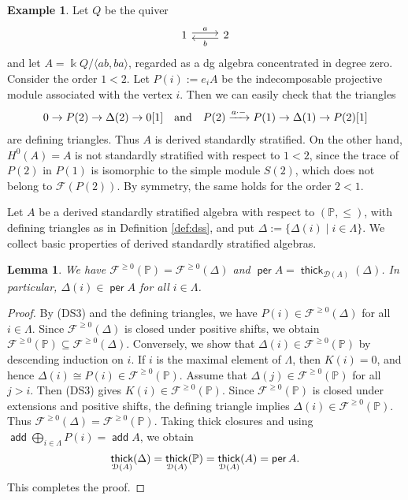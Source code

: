 \documentclass[a4paper,reqno,11pt]{amsart}
\numberwithin{equation}{section}
\newtheorem{lemma}[theorem]{Lemma}
\theoremstyle{definition}
\newtheorem{example}[theorem]{Example}
\newcommand{\D}{\mathcal{D}}
\newcommand{\F}{\mathcal{F}}
\newcommand{\PP}{\mathbb{P}}
\newcommand{\bde}{\Delta}
\newcommand{\kk}{\Bbbk}
\DeclareMathOperator{\add}{\mathsf{add}}
\DeclareMathOperator{\thick}{\mathsf{thick}}
\DeclareMathOperator{\per}{\mathsf{per}}
\begin{document}
\begin{example}\label{ex:two_cycle}
Let $Q$ be the quiver
\[
\begin{tikzcd}
1 \arrow[r, shift left, "a"] & 2 \arrow[l, shift left, "b"]
\end{tikzcd}
\]
and let $A=\kk Q/\langle ab,ba\rangle$, regarded as a dg algebra concentrated in degree zero.
Consider the order $1<2$.
Let $P(i):=e_{i}A$ be the indecomposable projective module associated with the vertex $i$.
Then we can easily check that the triangles
\begin{align}
0\to P(2)\to \bde(2)\to 0[1] \quad\text{and}\quad P(2)\xrightarrow{a\cdot -}P(1)\to\bde(1)\to P(2)[1]\notag
\end{align}
are defining triangles.
Thus $A$ is derived standardly stratified.
On the other hand, $H^{0}(A)=A$ is not standardly stratified with respect to $1<2$, since the trace of $P(2)$ in $P(1)$ is isomorphic to the simple module $S(2)$, which does not belong to $\F(P(2))$.
By symmetry, the same holds for the order $2<1$.
\end{example}

Let $A$ be a derived standardly stratified algebra with respect to $(\PP,\leq)$, with defining triangles as in Definition \ref{def:dss}, and put $\bde:=\{\bde(i)\mid i\in\Lambda\}$.
We collect basic properties of derived standardly stratified algebras.

\begin{lemma}\label{lem:thick=per}
We have $\F^{\geq 0}(\PP)=\F^{\geq 0}(\bde)$ and $\per A=\thick_{\D(A)}(\bde)$.
In particular, $\bde(i)\in\per A$ for all $i\in\Lambda$.
\end{lemma}
\begin{proof}
By (DS3) and the defining triangles, we have $P(i)\in\F^{\geq 0}(\bde)$ for all $i\in\Lambda$.
Since $\F^{\geq 0}(\bde)$ is closed under positive shifts, we obtain $\F^{\geq 0}(\PP)\subseteq\F^{\geq 0}(\bde)$.
Conversely, we show that $\bde(i)\in\F^{\geq 0}(\PP)$ by descending induction on $i$.
If $i$ is the maximal element of $\Lambda$, then $K(i)=0$, and hence $\bde(i)\cong P(i)\in\F^{\geq 0}(\PP)$.
Assume that $\bde(j)\in\F^{\geq 0}(\PP)$ for all $j>i$.
Then (DS3) gives $K(i)\in\F^{\geq 0}(\PP)$.
Since $\F^{\geq 0}(\PP)$ is closed under extensions and positive shifts, the defining triangle implies $\bde(i)\in\F^{\geq 0}(\PP)$.
Thus $\F^{\geq 0}(\bde)=\F^{\geq 0}(\PP)$.
Taking thick closures and using $\add\bigoplus_{i\in\Lambda}P(i)=\add A$, we obtain
\begin{align}
\thick_{\D(A)}(\bde) =\thick_{\D(A)}(\PP) =\thick_{\D(A)}(A) =\per A.\notag
\end{align}
This completes the proof.
\end{proof}
\end{document}
